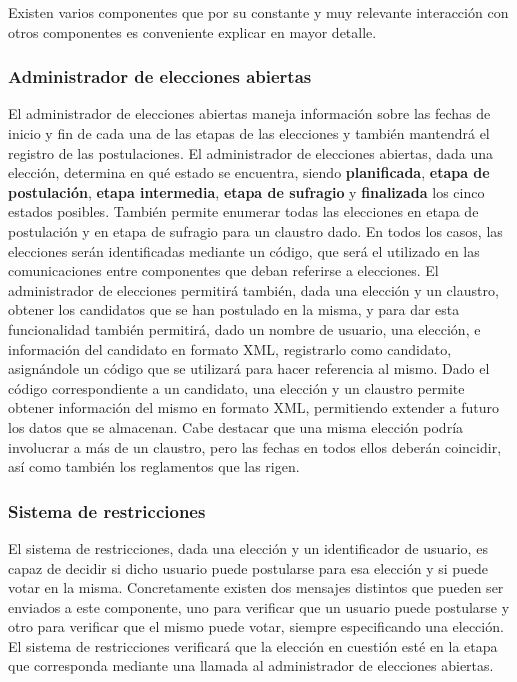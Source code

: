 Existen varios componentes que por su constante y muy relevante interacción con otros componentes es conveniente explicar en mayor detalle.

\subsubsection{Administrador de elecciones abiertas}

\label{admin_elecciones}

El administrador de elecciones abiertas maneja información sobre las fechas de inicio y fin de cada una de las etapas de las elecciones y también mantendrá el registro de las postulaciones. 
El administrador de elecciones abiertas, dada una elección, determina en qué estado se encuentra, siendo {\bf planificada}, {\bf etapa de postulación}, {\bf etapa intermedia},  {\bf etapa de sufragio} y {\bf finalizada} los cinco estados posibles. También permite enumerar todas las elecciones en etapa de postulación y en etapa de sufragio para un claustro dado. En todos los casos, las elecciones serán identificadas mediante un código, que será el utilizado en las comunicaciones entre componentes que deban referirse a elecciones.
El administrador de elecciones permitirá también, dada una elección y un claustro, obtener los candidatos que se han postulado en la misma, y para dar esta funcionalidad también permitirá, dado un nombre de usuario, una elección, e información del candidato en formato XML, registrarlo como candidato, asignándole un código que se utilizará para hacer referencia al mismo.
Dado el código correspondiente a un candidato, una elección y un claustro permite obtener información del mismo en formato XML, permitiendo extender a futuro los datos que se almacenan. 
Cabe destacar que una misma elección podría involucrar a más de un claustro, pero las fechas en todos ellos deberán coincidir, así como también los reglamentos que las rigen.

\subsubsection{Sistema de restricciones}

El sistema de restricciones, dada una elección y un identificador de usuario, es capaz de decidir si dicho usuario puede postularse para esa elección y si puede votar en la misma. Concretamente existen dos mensajes distintos que pueden ser enviados a este componente, uno para verificar que un usuario puede postularse y otro para verificar que el mismo puede votar, siempre especificando una elección.
El sistema de restricciones verificará que la elección en cuestión esté en la etapa que corresponda mediante una llamada al administrador de elecciones abiertas.
